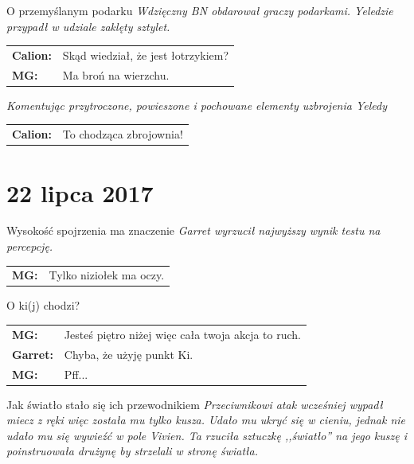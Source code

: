 \documentclass[10pt,twoside,twocolumn]{book}
\begin{document}
\begin{rpg-quotebox}{O przemyślanym podarku}
   \textit{Wdzięczny BN obdarował graczy podarkami. Yeledzie przypadł w udziale zaklęty sztylet.}\\
   
   \begin{tabularx}{\columnwidth}{lX}
      \textbf{Calion:} & Skąd wiedział, że jest łotrzykiem?\\
      \textbf{MG:} & Ma broń na wierzchu.\\
   \end{tabularx}
   \newline

   \textit{Komentując przytroczone, powieszone i pochowane elementy uzbrojenia Yeledy} \\
   
   \begin{tabularx}{\columnwidth}{lX}
      \textbf{Calion:} & To chodząca zbrojownia!\\
   \end{tabularx}
\end{rpg-quotebox}


\section*{22 lipca 2017}


\begin{rpg-quotebox}{Wysokość spojrzenia ma znaczenie}
   \textit{Garret wyrzucił najwyższy wynik testu na percepcję.} \\

   \begin{tabularx}{\columnwidth}{lX}
      \textbf{MG:} & Tylko niziołek ma oczy.\\
   \end{tabularx}
\end{rpg-quotebox}


\begin{rpg-quotebox}{O ki(j) chodzi?}
   \begin{tabularx}{\columnwidth}{lX}
      \textbf{MG:} & Jesteś piętro niżej więc cała twoja akcja to ruch.\\
      \textbf{Garret:} & Chyba, że użyję punkt Ki.\\
      \textbf{MG:} & Pff...\\
   \end{tabularx}
\end{rpg-quotebox}

\begin{rpg-quotebox}{Jak światło stało się ich przewodnikiem}
   \textit{Przeciwnikowi atak wcześniej wypadł miecz z ręki więc została mu tylko kusza. Udało mu ukryć się w cieniu, jednak nie udało mu się wywieźć w pole Vivien. Ta rzuciła sztuczkę ,,światło'' na jego kuszę i poinstruowała drużynę by strzelali w stronę światła.}
\end{rpg-quotebox}
\end{document}

